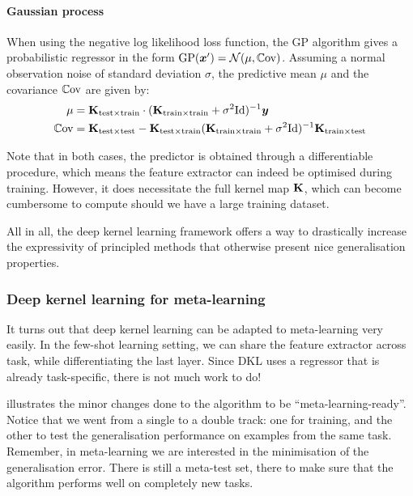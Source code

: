 \documentclass[11pt]{article}
\numberwithin{equation}{subsection}
\begin{document}
\paragraph{Gaussian process} When using the negative log likelihood loss function, the GP algorithm gives a probabilistic regressor in the form $\mathrm{GP}({\bm{x}}') = {\mathcal{N}}(\mu, \mathbb{C}\textrm{ov})$. Assuming a normal observation noise of standard deviation $\sigma$, the predictive mean $\mu$ and the covariance $\mathbb{C}\textrm{ov}$ are given by:
\begin{align*}
  \mu &= \mathbf{K}_{\mathrm{test} \times \mathrm{train}} \cdot (\mathbf{K}_{\mathrm{train} \times \mathrm{train}} + \sigma^2 \bm{\textrm{Id}})^{-1} {\bm{y}} \\
  \mathbb{C}\textrm{ov} &= \mathbf{K}_{\mathrm{test} \times \mathrm{test}} - \mathbf{K}_{\mathrm{test} \times \mathrm{train}} (\mathbf{K}_{\mathrm{train} \times \mathrm{train}} + \sigma^2 \bm{\textrm{Id}})^{-1} \mathbf{K}_{\mathrm{train} \times \mathrm{test}}
\end{align*}

Note that in both cases, the predictor is obtained through a differentiable procedure, which means the feature extractor can indeed be optimised during training. However, it does necessitate the full kernel map $\mathbf{K}$, which can become cumbersome to compute should we have a large training dataset.


All in all, the deep kernel learning framework offers a way to drastically increase the expressivity of principled methods that otherwise present nice generalisation properties.

\subsubsection{Deep kernel learning for meta-learning}
\label{sec:dkl-meta}

It turns out that deep kernel learning can be adapted to meta-learning very easily. In the few-shot learning setting, we can share the feature extractor across task, while differentiating the last layer. Since DKL uses a regressor that is already task-specific, there is not much work to do!

 illustrates the minor changes done to the algorithm to be ``meta-learning-ready''. Notice that we went from a single to a double track: one for training, and the other to test the generalisation performance on examples from the same task. Remember, in meta-learning we are interested in the minimisation of the generalisation error.
There is still a meta-test set, there to make sure that the algorithm performs well on completely new tasks.
\end{document}
